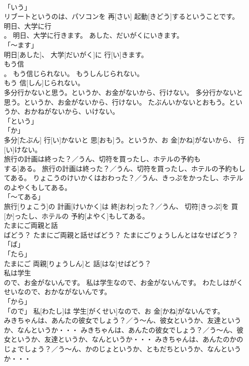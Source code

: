 \documentclass[8pt]{extreport}
\begin{document}
\begin{CJK}{UTF8}{min}
\\	「いう」 
\\	リブートというのは、パソコンを 再[さい] 起動[きどう]するということです。		
\\	明日、大学に行
\\	。	明日、大学に行きます。	あした、だいがくにいきます。	
\\	「～ます」 
\\	明日[あした]、 大学[だいがく]に 行[い]きます。		
\\	もう信
\\	。	もう信じられない。	もうしんじられない。	
\\	もう 信[しん]じられない。		
\\	多分行かないと思う。というか、お金がないから、行けない。	多分行かないと思う。というか、お金がないから、行けない。	たぶんいかないとおもう。というか、おかねがないから、いけない。	
\\	「という」 
\\	「か」 
\\	多分[たぶん] 行[い]かないと 思[おも]う。というか、お 金[かね]がないから、 行[い]けない。		
\\	旅行の計画は終った？／うん、切符を買ったし、ホテルの予約も
\\	する]ある。	旅行の計画は終った？／うん、切符を買ったし、ホテルの予約もしてある。	りょこうのけいかくはおわった？／うん、きっぷをかったし、ホテルのよやくもしてある。	
\\	「～てある」 
\\	旅行[りょこう]の 計画[けいかく]は 終[おわ]った？／うん、 切符[きっぷ]を 買[か]ったし、ホテルの 予約[よやく]もしてある。		
\\	たまにご両親と話
\\	ばどう？	たまにご両親と話せばどう？	たまにごりょうしんとはなせばどう？	
\\	「ば」 
\\	「たら」 
\\	たまにご 両親[りょうしん]と 話[はな]せばどう？		
\\	私は学生
\\	ので、お金がないんです。	私は学生なので、お金がないんです。	わたしはがくせいなので、おかながないんです。	
\\	「から」 
\\	「ので」	私[わたし]は 学生[がくせい]なので、お 金[かね]がないんです。		
\\	みきちゃんは、あんたの彼女でしょう？／う～ん、彼女というか、友達というか、なんというか・・・	みきちゃんは、あんたの彼女でしょう？／う～ん、彼女というか、友達というか、なんというか・・・	みきちゃんは、あんたのかのじょでしょう？／う～ん、かのじょというか、ともだちというか、なんというか・・・	

\end{CJK}
\end{document}
